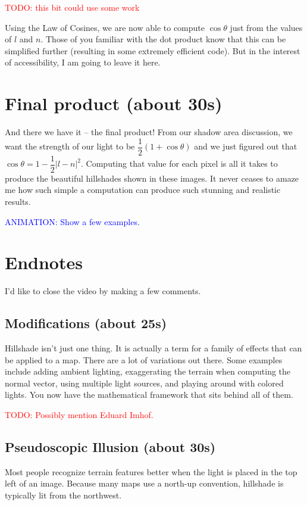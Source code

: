 \documentclass{article}
\newcommand\todo[1]{\textcolor{red}{TODO: #1}}
\newcommand\animation[1]{\textcolor{blue}{ANIMATION: #1}}
\begin{document}
\todo{this bit could use some work}

Using the Law of Cosines, we are now able to compute $\cos \theta$ just from the values of $l$ and $n$.
Those of you familiar with the dot product know that this can be simplified further (resulting in some extremely efficient code).
But in the interest of accessibility, I am going to leave it here.

\section{Final product (about 30s)}

And there we have it -- the final product!
From our shadow area discussion, we want the strength of our light to be $\dfrac{1}{2}(1 + \cos \theta)$ and we just figured out that $\cos \theta = 1 - \dfrac{1}{2}|l-n|^2$.
Computing that value for each pixel is all it takes to produce the beautiful hillshades shown in these images.
It never ceases to amaze me how such simple a computation can produce such stunning and realistic results.

\animation{Show a few examples.}

\section{Endnotes}

I'd like to close the video by making a few comments.

\subsection{Modifications (about 25s)}

Hillshade isn't just one thing.
It is actually a term for a family of effects that can be applied to a map.
There are a lot of variations out there.
Some examples include adding ambient lighting, exaggerating the terrain when computing the normal vector, using multiple light sources, and playing around with colored lights.
You now have the mathematical framework that sits behind all of them.

\todo{Possibly mention Eduard Imhof.}

\subsection{Pseudoscopic Illusion (about 30s)}

Most people recognize terrain features better when the light is placed in the top left of an image.
Because many maps use a north-up convention, hillshade is typically lit from the northwest.
\end{document}
